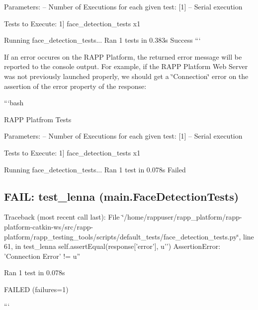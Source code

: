 \begin{DoxyItemize}
\item Parameters\-: -- Number of Executions for each given test\-: \mbox{[}1\mbox{]} -- Serial execution
\item Tests to Execute\-: 1\mbox{]} face\-\_\-detection\-\_\-tests x1
\end{DoxyItemize}

Running face\-\_\-detection\-\_\-tests... Ran 1 tests in 0.\-383s Success ```

If an error occures on the R\-A\-P\-P Platform, the returned error message will be reported to the console output. For example, if the R\-A\-P\-P Platform Web Server was not previously launched properly, we should get a \char`\"{}\-Connection\char`\"{} error on the assertion of the {\ttfamily error} property of the response\-:

```bash 

 R\-A\-P\-P Platfrom Tests 




\begin{DoxyItemize}
\item Parameters\-: -- Number of Executions for each given test\-: \mbox{[}1\mbox{]} -- Serial execution
\item Tests to Execute\-: 1\mbox{]} face\-\_\-detection\-\_\-tests x1
\end{DoxyItemize}

Running face\-\_\-detection\-\_\-tests... Ran 1 test in 0.\-078s Failed 

 \subsection*{F\-A\-I\-L\-: test\-\_\-lenna ({\bfseries main}.Face\-Detection\-Tests) }

Traceback (most recent call last)\-: File \char`\"{}/home/rappuser/rapp\-\_\-platform/rapp-\/platform-\/catkin-\/ws/src/rapp-\/platform/rapp\-\_\-testing\-\_\-tools/scripts/default\-\_\-tests/face\-\_\-detection\-\_\-tests.\-py\char`\"{}, line 61, in test\-\_\-lenna self.\-assert\-Equal(response\mbox{[}'error'\mbox{]}, u'') Assertion\-Error\-: 'Connection Error' != u'' 

 Ran 1 test in 0.\-078s

F\-A\-I\-L\-E\-D (failures=1)

``` 